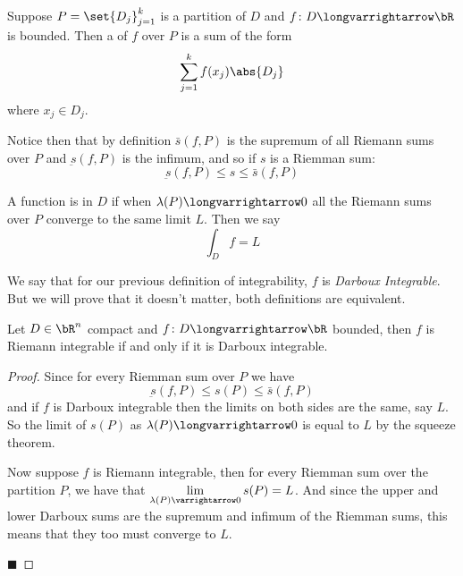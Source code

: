\documentclass[10pt]{article}
\begin{document}
\begin{defn*}

    Suppose $P=\set{D_j}_{j=1}^k$ is a partition of $D$ and $f\colon D\longvarrightarrow\bR$ is
    bounded.
    Then a  of $f$ over $P$ is a sum of the form
    \[ \sum_{j=1}^k f(x_j)\abs{D_j} \]
    where $x_j\in D_j$.

\end{defn*}

Notice then that by definition $\bar s(f,P)$ is the supremum of all Riemann sums over $P$ and
$\underbar s(f,P)$ is the infimum, and so if $s$ is a Riemman sum:
\[ \underbar s(f,P) \leq s\leq \bar s(f,P) \]

\begin{defn*}

    A function is  in $D$ if when $\lambda(P)\longvarrightarrow0$ all
    the Riemann sums over $P$ converge to the same limit $L$.
    Then we say
    \[ \int_D f = L \]

\end{defn*}

We say that for our previous definition of integrability, $f$ is \emph{Darboux Integrable}.
But we will prove that it doesn't matter, both definitions are equivalent.

\begin{thrm*}

    Let $D\in\bR^n$ compact and $f\colon D\longvarrightarrow\bR$ bounded, then
    $f$ is Riemann integrable if and only if it is Darboux integrable.

\end{thrm*}

\begin{proof}

    Since for every Riemman sum over $P$ we have
    \[ \underbar s(f,P) \leq s(P) \leq \bar s(f,P) \]
    and if $f$ is Darboux integrable then the limits on both sides are the same, say $L$.
    So the limit of $s(P)$ as $\lambda(P)\longvarrightarrow0$ is equal to $L$ by the squeeze
    theorem.

    Now suppose $f$ is Riemann integrable, then for every Riemman sum over the partition $P$, we
    have that $\lim\limits_{\lambda(P)\varrightarrow0}s(P)=L$.
    And since the upper and lower Darboux sums are the supremum and infimum of the Riemman sums,
    this means that they too must converge to $L$.

    \hfill$\blacksquare$

\end{proof}
\end{document}
